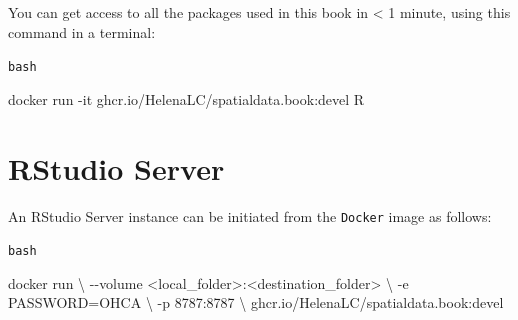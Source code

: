 \documentclass[
  letterpaper,
  DIV=11,
  numbers=noendperiod]{scrreprt}
\newenvironment{Shaded}{\begin{snugshade}}{\end{snugshade}}
\newcommand{\AttributeTok}[1]{\textcolor[rgb]{0.40,0.45,0.13}{#1}}
\newcommand{\DataTypeTok}[1]{\textcolor[rgb]{0.68,0.00,0.00}{#1}}
\newcommand{\ExtensionTok}[1]{\textcolor[rgb]{0.00,0.23,0.31}{#1}}
\newcommand{\NormalTok}[1]{\textcolor[rgb]{0.00,0.23,0.31}{#1}}
\newcommand{\OperatorTok}[1]{\textcolor[rgb]{0.37,0.37,0.37}{#1}}
\begin{document}
\begin{tcolorbox}[enhanced jigsaw, opacityback=0, toprule=.15mm, bottomtitle=1mm, rightrule=.15mm, breakable, bottomrule=.15mm, colframe=quarto-callout-tip-color-frame, colback=white, coltitle=black, left=2mm, titlerule=0mm, title=\textcolor{quarto-callout-tip-color}{\faLightbulb}\hspace{0.5em}{Get started now 🎉}, toptitle=1mm, arc=.35mm, colbacktitle=quarto-callout-tip-color!10!white, leftrule=.75mm, opacitybacktitle=0.6]

You can get access to all the packages used in this book in \textless{}
1 minute, using this command in a terminal:

\begin{codelisting}[H]

\caption{\texttt{bash}}

\begin{Shaded}
\begin{Highlighting}[]
\ExtensionTok{docker}\NormalTok{ run }\AttributeTok{{-}it}\NormalTok{ ghcr.io/HelenaLC/spatialdata.book:devel R}
\end{Highlighting}
\end{Shaded}

\end{codelisting}

\end{tcolorbox}


\chapter*{RStudio Server}\label{rstudio-server}


An RStudio Server instance can be initiated from the \texttt{Docker}
image as follows:

\begin{codelisting}

\caption{\texttt{bash}}

\begin{Shaded}
\begin{Highlighting}[]
\ExtensionTok{docker}\NormalTok{ run }\DataTypeTok{\textbackslash{}}
    \AttributeTok{{-}{-}volume} \OperatorTok{\textless{}}\NormalTok{local\_folder}\OperatorTok{\textgreater{}}\NormalTok{:}\OperatorTok{\textless{}}\NormalTok{destination\_folder}\OperatorTok{\textgreater{}} \DataTypeTok{\textbackslash{}}
    \AttributeTok{{-}e}\NormalTok{ PASSWORD=OHCA }\DataTypeTok{\textbackslash{}}
    \AttributeTok{{-}p}\NormalTok{ 8787:8787 }\DataTypeTok{\textbackslash{}}
\NormalTok{    ghcr.io/HelenaLC/spatialdata.book:devel}
\end{Highlighting}
\end{Shaded}

\end{codelisting}
\end{document}
